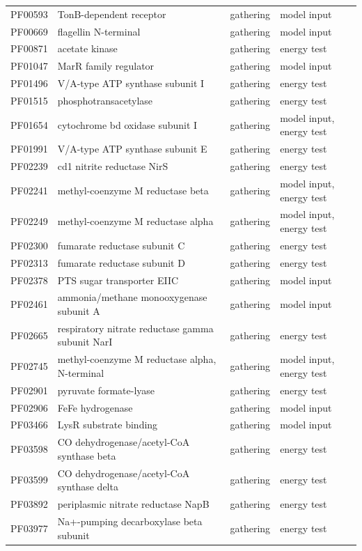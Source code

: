 \begin{longtable}{p{1.6cm}p{8.2cm}p{1.8cm}p{3cm}}
PF00593 & TonB-dependent receptor & gathering & model input \\
PF00669 & flagellin N-terminal & gathering & model input \\
PF00871 & acetate kinase & gathering & energy test \\
PF01047 & MarR family regulator & gathering & model input \\
PF01496 & V/A-type ATP synthase subunit I & gathering & energy test \\
PF01515 & phosphotransacetylase & gathering & energy test \\
PF01654 & cytochrome bd oxidase subunit I & gathering & model input, energy test \\
PF01991 & V/A-type ATP synthase subunit E & gathering & energy test \\
PF02239 & cd1 nitrite reductase NirS & gathering & energy test \\
PF02241 & methyl-coenzyme M reductase beta & gathering & model input, energy test \\
PF02249 & methyl-coenzyme M reductase alpha & gathering & model input, energy test \\
PF02300 & fumarate reductase subunit C & gathering & energy test \\
PF02313 & fumarate reductase subunit D & gathering & energy test \\
PF02378 & PTS sugar transporter EIIC & gathering & model input \\
PF02461 & ammonia/methane monooxygenase subunit A & gathering & model input \\
PF02665 & respiratory nitrate reductase gamma subunit NarI & gathering & energy test \\
PF02745 & methyl-coenzyme M reductase alpha, N-terminal & gathering & model input, energy test \\
PF02901 & pyruvate formate-lyase & gathering & energy test \\
PF02906 & FeFe hydrogenase & gathering & model input \\
PF03466 & LysR substrate binding & gathering & model input \\
PF03598 & CO dehydrogenase/acetyl-CoA synthase beta & gathering & energy test \\
PF03599 & CO dehydrogenase/acetyl-CoA synthase delta & gathering & energy test \\
PF03892 & periplasmic nitrate reductase NapB & gathering & energy test \\
PF03977 & Na+-pumping decarboxylase beta subunit & gathering & energy test \\

\end{longtable}
